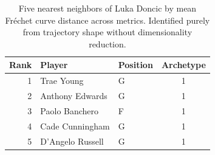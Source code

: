 \begin{table}[htbp]
  \centering\small
  \begin{tabular}{rllc}
    \toprule
    Rank & Player & Position & Archetype \\
    \midrule
    1 & Trae Young & G & 1 \\
    2 & Anthony Edwards & G & 1 \\
    3 & Paolo Banchero & F & 1 \\
    4 & Cade Cunningham & G & 1 \\
    5 & D'Angelo Russell & G & 1 \\
    \bottomrule
  \end{tabular}
  \caption{Five nearest neighbors of Luka Doncic by mean Fr\'{e}chet curve distance across metrics. Identified purely from trajectory shape without dimensionality reduction.}
  \label{tab:Luka_Doncic_frechet_curve_neighbors}
\end{table}

